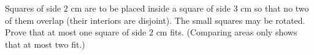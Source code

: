 Squares of side $2$ cm are to be placed inside a square of side $3$ cm so that no two of them overlap (their interiors are disjoint). The small squares may be rotated. Prove that at most one square of side $2$ cm fits. (Comparing areas only shows that at most two fit.)
